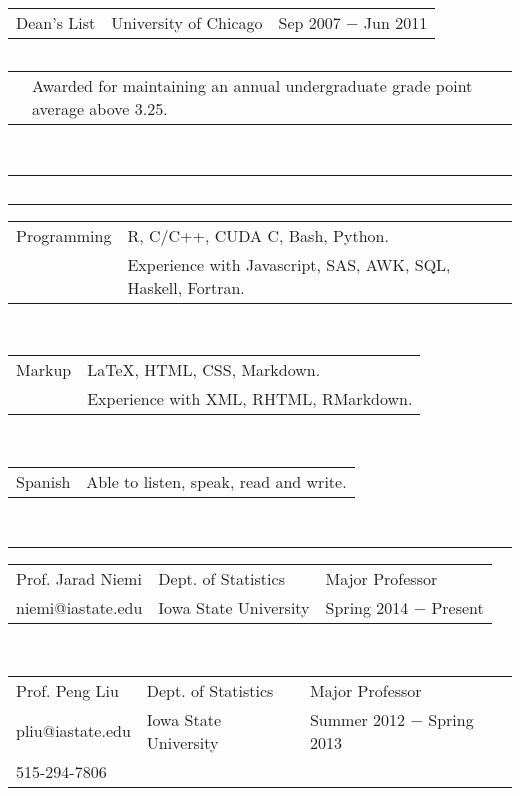 \documentclass{article}
\newcommand{\q}{$\quad$ \newline}
\newcommand{\vl}{4.25}
\newcommand{\wl}{8.4}
\newcommand{\ww}{13}
\newcommand{\myrule}{\noindent \rule{\textwidth}{1pt}}
\begin{document}
\noindent \begin{tabular}{@{}p{\vl cm}p{\wl cm}l@{}}
Dean's List & University of Chicago & Sep 2007 $-$ Jun 2011 \\
\end{tabular} \q

\noindent \begin{tabular}{@{}p{\vl cm}p{\ww cm}@{}}
& Awarded for maintaining an annual undergraduate grade point average above 3.25. 
\end{tabular} \q \q 



\myrule
\nocite{*}

\noindent  \q



\myrule
 
\noindent \begin{tabular}{@{}p{\vl cm}p{\ww cm}@{}}
Programming & R, C/C++, CUDA C, Bash, Python.   \\
 & Experience with Javascript, SAS, AWK, SQL, Haskell, Fortran.  \\
\end{tabular} \q \q

\noindent \begin{tabular}{@{}p{\vl cm}p{\ww cm}@{}}
Markup& LaTeX, HTML, CSS, Markdown.   \\
 & Experience with XML, RHTML, RMarkdown.  \\
\end{tabular} \q \q

\noindent \begin{tabular}{@{}p{\vl cm}p{\ww cm}@{}}
Spanish & Able to listen, speak, read and write.   \\
\end{tabular} \q \q \q


\myrule

\noindent \begin{tabular}{@{}p{\vl cm}p{\wl cm}l@{}}
Prof. Jarad Niemi & Dept. of Statistics & Major Professor  \\
niemi@iastate.edu & Iowa State University & Spring 2014 $-$ Present \\
\end{tabular} \q \q

\noindent \begin{tabular}{@{}p{\vl cm}p{\wl cm}l@{}}
Prof. Peng Liu & Dept. of Statistics & Major Professor \\
pliu@iastate.edu & Iowa State University & Summer 2012 $-$ Spring 2013 \\
515-294-7806 & & 
\end{tabular} \q \q
\end{document}

